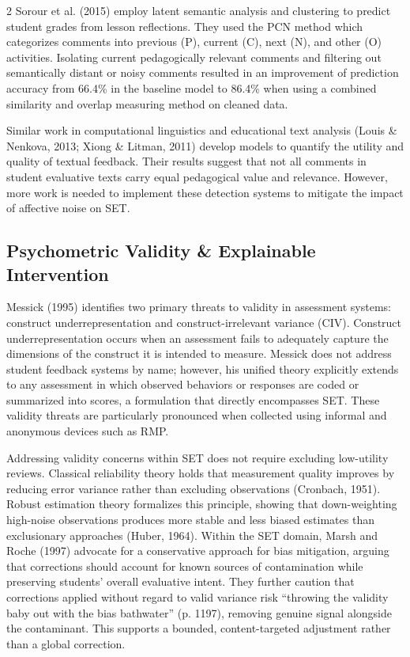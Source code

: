 \documentclass{article}
\begin{document}
\begin{multicols*}{2}
Sorour et al. (2015) employ latent semantic analysis and clustering to predict student grades from lesson reflections. They used the PCN method which categorizes comments into previous (P), current (C), next (N), and other (O) activities. Isolating current pedagogically relevant comments and filtering out semantically distant or noisy comments resulted in an improvement of prediction accuracy from 66.4\% in the baseline model to 86.4\% when using a combined similarity and overlap measuring method on cleaned data.

Similar work in computational linguistics and educational text analysis (Louis \& Nenkova, 2013; Xiong \& Litman, 2011) develop models to quantify the utility and quality of textual feedback. Their results suggest that not all comments in student evaluative texts carry equal pedagogical value and relevance. However, more work is needed to implement these detection systems to mitigate the impact of affective noise on SET.

\subsection{Psychometric Validity \& Explainable Intervention}
Messick (1995) identifies two primary threats to validity in assessment systems: construct underrepresentation and construct-irrelevant variance (CIV). Construct underrepresentation occurs when an assessment fails to adequately capture the dimensions of the construct it is intended to measure. Messick does not address student feedback systems by name; however, his unified theory explicitly extends to any assessment in which observed behaviors or responses are coded or summarized into scores, a formulation that directly encompasses SET. These validity threats are particularly pronounced when collected using informal and anonymous devices such as RMP.

Addressing validity concerns within SET does not require excluding low-utility reviews. Classical reliability theory holds that measurement quality improves by reducing error variance rather than excluding observations (Cronbach, 1951). Robust estimation theory formalizes this principle, showing that down-weighting high-noise observations produces more stable and less biased estimates than exclusionary approaches (Huber, 1964). Within the SET domain, Marsh and Roche (1997) advocate for a conservative approach for bias mitigation, arguing that corrections should account for known sources of contamination while preserving students' overall evaluative intent. They further caution that corrections applied without regard to valid variance risk ``throwing the validity baby out with the bias bathwater'' (p. 1197), removing genuine signal alongside the contaminant. This supports a bounded, content-targeted adjustment rather than a global correction.


\end{multicols*}
\end{document}
